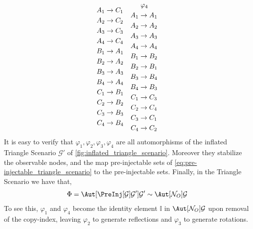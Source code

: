 \documentclass[aps, 10pt, english, twoside, pra, nofootinbib, longbibliography]{revtex4-1}
\theoremstyle{plain}
\theoremstyle{definition}
\theoremstyle{remark}
\newcommand{\graph}{\mathcal{G}}
\newcommand{\nodes}{\mathcal{N}}
\begin{document}
\begin{equation*}
\begin{aligned}[c]
    A_1 &\to C_1 \\A_2 &\to C_2 \\A_3 &\to C_3 \\A_4 &\to C_4 \\B_1 &\to A_1 \\B_2 &\to A_2 \\B_3 &\to A_3 \\B_4 &\to A_4 \\C_1 &\to B_1 \\C_2 &\to B_2 \\C_3 &\to B_3 \\C_4 &\to B_4
    \end{aligned}
    \quad
    \begin{aligned}[c]
    &\hspace{1mm}\varphi_4 \\
    A_1 &\to A_1 \\A_2 &\to A_2 \\A_3 &\to A_3 \\A_4 &\to A_4 \\B_1 &\to B_2 \\B_2 &\to B_1 \\B_3 &\to B_4 \\B_4 &\to B_3 \\C_1 &\to C_3 \\C_2 &\to C_4 \\C_3 &\to C_1 \\C_4 &\to C_2
    \end{aligned}
    \end{equation*}
    It is easy to verify that $\varphi_1, \varphi_2, \varphi_3, \varphi_4$ are all automorphisms of the inflated Triangle Scenario $\graph'$ of \cref{fig:inflated_triangle_scenario}. Moreover they stabilize the observable nodes, and the map pre-injectable sets of \cref{eq:pre-injectable_triangle_scenario} to the pre-injectable sets. Finally, in the Triangle Scenario we have that,
    \[ \Phi = \Aut[\PreInj[\graph]{\graph'}]{\graph'} \sim \Aut[\nodes_O]{\graph} \]
    To see this, $\varphi_1$ and $\varphi_4$ become the identity element $\mathbb{I}$ in $\Aut[\nodes_O]{\graph}$ upon removal of the copy-index, leaving $\varphi_2$ to generate reflections and $\varphi_3$ to generate rotations.
\end{document}
